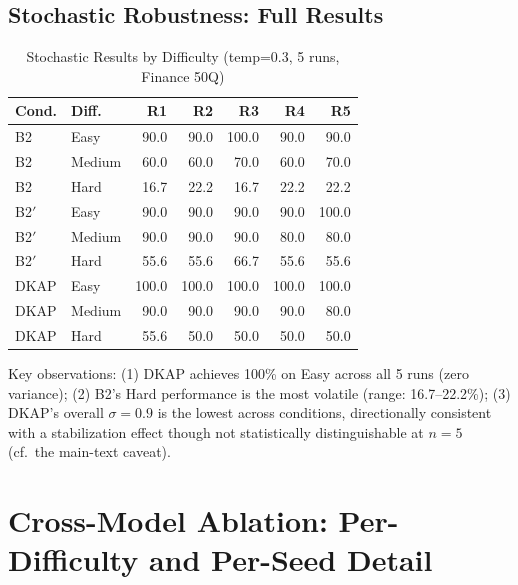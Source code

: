 \documentclass[10pt,a4paper]{article}
\begin{document}
\subsection{Stochastic Robustness: Full Results}

\begin{table}[H]
\centering
\caption{Stochastic Results by Difficulty (temp=0.3, 5 runs, Finance 50Q)}
\label{tab:stochastic_full}
\footnotesize
\begin{tabular}{@{}llrrrrr@{}}
\toprule
\textbf{Cond.} & \textbf{Diff.} & \textbf{R1} & \textbf{R2} & \textbf{R3} & \textbf{R4} & \textbf{R5} \\
\midrule
B2       & Easy   & 90.0 & 90.0 & 100.0 & 90.0 & 90.0 \\
B2       & Medium & 60.0 & 60.0 & 70.0 & 60.0 & 70.0 \\
B2       & Hard   & 16.7 & 22.2 & 16.7 & 22.2 & 22.2 \\
\midrule
B2$'$    & Easy   & 90.0 & 90.0 & 90.0 & 90.0 & 100.0 \\
B2$'$    & Medium & 90.0 & 90.0 & 90.0 & 80.0 & 80.0 \\
B2$'$    & Hard   & 55.6 & 55.6 & 66.7 & 55.6 & 55.6 \\
\midrule
DKAP     & Easy   & 100.0 & 100.0 & 100.0 & 100.0 & 100.0 \\
DKAP     & Medium & 90.0 & 90.0 & 90.0 & 90.0 & 80.0 \\
DKAP     & Hard   & 55.6 & 50.0 & 50.0 & 50.0 & 50.0 \\
\bottomrule
\end{tabular}
\end{table}

Key observations: (1) DKAP achieves 100\% on Easy across all 5 runs (zero variance); (2) B2's Hard performance is the most volatile (range: 16.7--22.2\%); (3) DKAP's overall $\sigma = 0.9$ is the lowest across conditions, directionally consistent with a stabilization effect though not statistically distinguishable at $n=5$ (cf.\ the main-text caveat).


\section{Cross-Model Ablation: Per-Difficulty and Per-Seed Detail}
\label{sec:crossmodel_detail}
\end{document}
